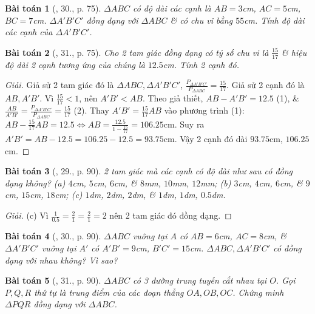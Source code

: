 \documentclass{article}
\newtheorem{baitoan}{Bài toán}
\begin{document}
\begin{baitoan}[\cite{SGK_Toan_8_tap_2}, 30., p. 75]
	$\Delta ABC$ có độ dài các cạnh là $AB = 3$\emph{cm}, $AC = 5$\emph{cm}, $BC = 7$\emph{cm}. $\Delta A'B'C'$ đồng dạng với $\Delta ABC$ \& có chu vi bằng $55$\emph{cm}. Tính độ dài các cạnh của $\Delta A'B'C'$.
\end{baitoan}

\begin{baitoan}[\cite{SGK_Toan_8_tap_2}, 31., p. 75]
	Cho 2 tam giác đồng dạng có tỷ số chu vi là $\frac{15}{17}$ \& hiệu độ dài 2 cạnh tương ứng của chúng là $12.5$\emph{cm}. Tính 2 cạnh đó.
\end{baitoan}

\begin{proof}[Giải]
	Giả sử 2 tam giác đó là $\Delta ABC,\Delta A'B'C'$, $\frac{P_{\Delta A'B'C'}}{P_{\Delta ABC}} = \frac{15}{17}$. Giả sử 2 cạnh đó là $AB,A'B'$. Vì $\frac{15}{17} < 1$, nên $A'B' < AB$. Theo giả thiết, $AB - A'B' = 12.5$ (1), \& $\frac{AB}{A'B'} = \frac{P_{\Delta A'B'C'}}{P_{\Delta ABC}} = \frac{15}{17}$ (2). Thay $A'B' = \frac{15}{17}AB$ vào phương trình (1): $AB - \frac{15}{17}AB = 12.5\Leftrightarrow AB = \frac{12.5}{1 - \frac{15}{17}} = 106.25$cm. Suy ra $A'B' = AB - 12.5 = 106.25 - 12.5 = 93.75$cm. Vậy 2 cạnh đó dài $93.75$cm, $106.25$cm.
\end{proof}

\begin{baitoan}[\cite{SBT_Toan_8_tap_2}, 29., p. 90]
	2 tam giác mà các cạnh có độ dài như sau có đồng dạng không? (a) $4$\emph{cm}, $5$\emph{cm}, $6$\emph{cm}, \& $8$\emph{mm}, $10$\emph{mm}, $12$\emph{mm}; (b) $3$\emph{cm}, $4$\emph{cm}, $6$\emph{cm}, \& $9$\emph{cm}, $15$\emph{cm}, $18$\emph{cm}; (c) $1$\emph{dm}, $2$\emph{dm}, $2$\emph{dm}, \& $1$\emph{dm}, $1$\emph{dm}, $0.5$\emph{dm}.
\end{baitoan}

\begin{proof}[Giải]
	(c) Vì $\frac{1}{0.5} = \frac{2}{1} = \frac{2}{1} = 2$ nên 2 tam giác đó đồng dạng.
\end{proof}

\begin{baitoan}[\cite{SBT_Toan_8_tap_2}, 30., p. 90]
	$\Delta ABC$ vuông tại $A$ có $AB = 6$\emph{cm}, $AC = 8$\emph{cm}, \& $\Delta A'B'C'$ vuông tại $A'$ có $A'B' = 9$\emph{cm}, $B'C' = 15$\emph{cm}. $\Delta ABC,\Delta A'B'C'$ có đồng dạng với nhau không? Vì sao?
\end{baitoan}

\begin{baitoan}[\cite{SBT_Toan_8_tap_2}, 31., p. 90]
	$\Delta ABC$ có 3 đường trung tuyến cắt nhau tại $O$. Gọi $P,Q,R$ thứ tự là trung điểm của các đoạn thẳng $OA,OB,OC$. Chứng minh $\Delta PQR$ đồng dạng với $\Delta ABC$.
\end{baitoan}
\end{document}
